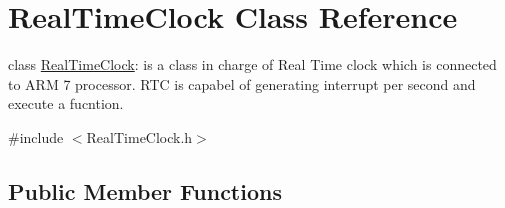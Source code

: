 \hypertarget{class_real_time_clock}{
\section{RealTimeClock Class Reference}
\label{d5/dd2/class_real_time_clock}
}


class \hyperlink{class_real_time_clock}{RealTimeClock}: is a class in charge of Real Time clock which is connected to ARM 7 processor. RTC is capabel of generating interrupt per second and execute a fucntion.  




{\ttfamily \#include $<$RealTimeClock.h$>$}

\subsection*{Public Member Functions}
